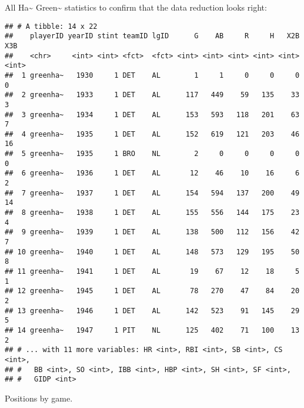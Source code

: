 \documentclass[]{book}
\newenvironment{Shaded}{\begin{snugshade}}{\end{snugshade}}
\newcommand{\KeywordTok}[1]{\textcolor[rgb]{0.13,0.29,0.53}{\textbf{#1}}}
\newcommand{\DataTypeTok}[1]{\textcolor[rgb]{0.13,0.29,0.53}{#1}}
\newcommand{\StringTok}[1]{\textcolor[rgb]{0.31,0.60,0.02}{#1}}
\newcommand{\CommentTok}[1]{\textcolor[rgb]{0.56,0.35,0.01}{\textit{#1}}}
\newcommand{\OperatorTok}[1]{\textcolor[rgb]{0.81,0.36,0.00}{\textbf{#1}}}
\newcommand{\NormalTok}[1]{#1}
\begin{document}
All Ha\textasciitilde{} Green\textasciitilde{} statistics to confirm
that the data reduction looks right:

\begin{Shaded}
\end{Shaded}

\begin{verbatim}
## # A tibble: 14 x 22
##    playerID yearID stint teamID lgID      G    AB     R     H   X2B   X3B
##    <chr>     <int> <int> <fct>  <fct> <int> <int> <int> <int> <int> <int>
##  1 greenha~   1930     1 DET    AL        1     1     0     0     0     0
##  2 greenha~   1933     1 DET    AL      117   449    59   135    33     3
##  3 greenha~   1934     1 DET    AL      153   593   118   201    63     7
##  4 greenha~   1935     1 DET    AL      152   619   121   203    46    16
##  5 greenha~   1935     1 BRO    NL        2     0     0     0     0     0
##  6 greenha~   1936     1 DET    AL       12    46    10    16     6     2
##  7 greenha~   1937     1 DET    AL      154   594   137   200    49    14
##  8 greenha~   1938     1 DET    AL      155   556   144   175    23     4
##  9 greenha~   1939     1 DET    AL      138   500   112   156    42     7
## 10 greenha~   1940     1 DET    AL      148   573   129   195    50     8
## 11 greenha~   1941     1 DET    AL       19    67    12    18     5     1
## 12 greenha~   1945     1 DET    AL       78   270    47    84    20     2
## 13 greenha~   1946     1 DET    AL      142   523    91   145    29     5
## 14 greenha~   1947     1 PIT    NL      125   402    71   100    13     2
## # ... with 11 more variables: HR <int>, RBI <int>, SB <int>, CS <int>,
## #   BB <int>, SO <int>, IBB <int>, HBP <int>, SH <int>, SF <int>,
## #   GIDP <int>
\end{verbatim}

Positions by game.

\begin{Shaded}
\end{Shaded}
\end{document}
